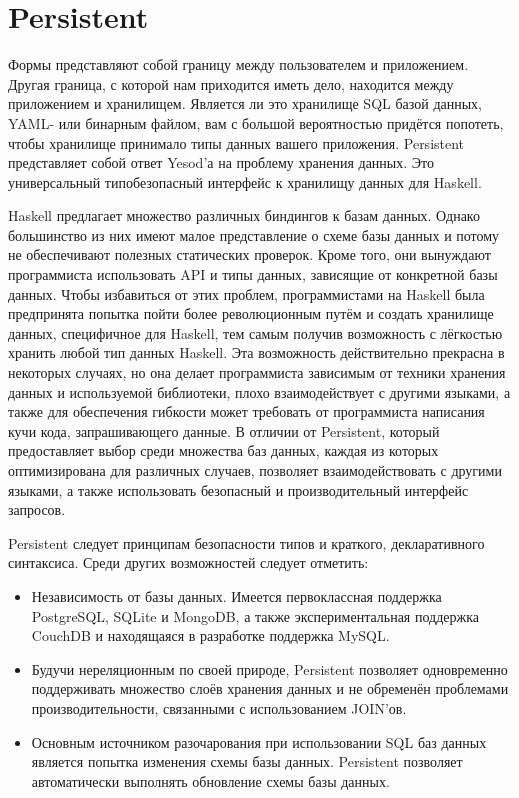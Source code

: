 \chapter{Persistent}\label{chap:persistent}

Формы представляют собой границу между пользователем и приложением. Другая граница, с которой нам приходится иметь дело, находится между приложением и хранилищем. Является ли это хранилище SQL базой данных, YAML- или бинарным файлом, вам с большой вероятностью придётся попотеть, чтобы хранилище принимало типы данных вашего приложения. Persistent представляет собой ответ Yesod'а на проблему хранения данных. Это универсальный типобезопасный интерфейс к хранилищу данных для Haskell.

Haskell предлагает множество различных биндингов к базам данных. Однако большинство из них имеют малое представление о схеме базы данных и потому не обеспечивают полезных статических проверок. Кроме того, они вынуждают программиста использовать API и типы данных, зависящие от конкретной базы данных. Чтобы избавиться от этих проблем, программистами на Haskell была предпринята попытка пойти более революционным путём и создать хранилище данных, специфичное для Haskell, тем самым получив возможность с лёгкостью хранить любой тип данных Haskell. Эта возможность действительно прекрасна в некоторых случаях, но она делает программиста зависимым от техники хранения данных и используемой библиотеки, плохо взаимодействует с другими языками, а также для обеспечения гибкости может требовать от программиста написания кучи кода, запрашивающего данные. В отличии от Persistent, который предоставляет выбор среди множества баз данных, каждая из которых оптимизирована для различных случаев, позволяет взаимодействовать с другими языками, а также использовать безопасный и производительный интерфейс запросов.

Persistent следует принципам безопасности типов и краткого, декларативного синтаксиса. Среди других возможностей следует отметить:

\begin{itemize}
  \item Независимость от базы данных. Имеется первоклассная поддержка PostgreSQL, SQLite и MongoDB, а также экспериментальная поддержка CouchDB и находящаяся в разработке поддержка MySQL.
  \item Будучи нереляционным по своей природе, Persistent позволяет одновременно поддерживать множество слоёв хранения данных и не обременён проблемами производительности, связанными с использованием JOIN'ов.
  \item Основным источником разочарования при использовании SQL баз данных является попытка изменения схемы базы данных. Persistent позволяет автоматически выполнять обновление схемы базы данных.
\end{itemize}

